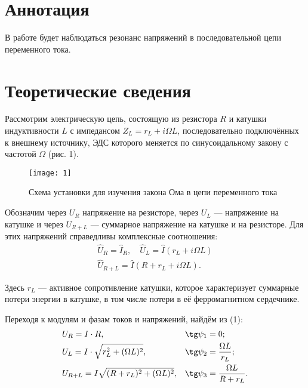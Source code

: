  


\section{Аннотация}
В работе будет наблюдаться резонанс
напряжений в последовательной цепи
переменного тока. 

\section{Теоретические сведения}

Рассмотрим электрическую цепь, состоящую
из резистора $R$ и катушки
индуктивности $L$ 
с импедансом $Z_L = r_L+i\Omega L$,
последовательно подключённых к внешнему
источнику, ЭДС которого меняется по
синусоидальному закону с частотой
$\Omega$ (рис. 1).

\begin{wrapfigure}{r}{0.5\linewidth}
    \vspace{-5ex}
    \texttt{[image: 1]}
    \captionsetup{justification=centering}
    \caption{Схема установки для
        изучения закона Ома в цепи
    переменного тока}
\end{wrapfigure}

Обозначим через $U_R$ напряжение на
резисторе, через $U_L$ — напряжение на
катушке и через $U_{R+L}$ — суммарное
напряжение на катушке и на резисторе.
Для этих напряжений справедливы
комплексные соотношения:
\begin{equation}
    \begin{aligned}
    \widehat U_R = \widehat I_R, \quad
    \widehat U_L = \widehat I (r_L +
    i\Omega L)\\
    \widehat U_{R+L} = \widehat I
    (R+r_L + i\Omega L).
\end{aligned}
\end{equation}

Здесь $r_L$ — активное сопротивление
катушки, которое характеризует суммарные
потери энергии в катушке, в том числе
потери в её ферромагнитном сердечнике. 

Переходя к модулям и фазам токов и
напряжений, найдём из (1):
\begin{align}
    & U_R = I \cdot R, & \tg \psi_1 &= 0;
    \\
    & U_L = I \cdot \sqrt{r_L^2+(\Omega
        L)^2}, & \tg \psi_2 &= \frac{\Omega
L}{r_L};\\
    & U_{R+L} = I \sqrt {(R+r_L)^2
    +(\Omega L)^2} , & \tg \psi_3 &=
    \frac{\Omega L}{R + r_L}.
\end{align}

